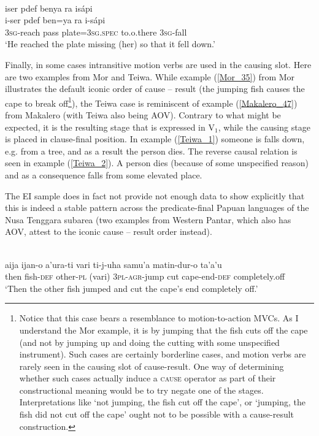 \ea \label{Biak_43}
\\
\glll iser pdef benya ra isápi \\
i-ser pdef ben=ya ra i-sápi \\
3\textsc{sg}-reach pass plate=3\textsc{sg}.\textsc{spec} to.o.there 3\textsc{sg}-fall \\
\glft `He reached the plate missing (her) so that it fell down.' \\
\z

Finally, in some cases intransitive motion verbs are used in the causing slot. Here are two examples from Mor and Teiwa. While example (\ref{Mor_35}) from Mor illustrates the default iconic order of cause -- result (the jumping fish causes the cape to break off\footnote{Notice that this case bears a resemblance to motion-to-action MVCs. As I understand the Mor example, it is by jumping that the fish cuts off the cape (and not by jumping up and doing the cutting with some unspecified instrument). Such cases are certainly borderline cases, and motion verbs are rarely seen in the causing slot of cause-result. One way of determining whether such cases actually induce a \textsc{cause} operator as part of their constructional meaning would be to try negate one of the stages. Interpretations like `not jumping, the fish cut off the cape', or `jumping, the fish did not cut off the cape' ought not to be possible with a cause-result construction.}), the Teiwa case is reminiscent of example (\ref{Makalero_47}) from Makalero (with Teiwa also being AOV). Contrary to what might be expected, it is the resulting stage that is expressed in V$_1$, while the causing stage is placed in clause-final position. In example (\ref{Teiwa_1}) someone is falls down, e.g. from a tree, and as a result the person dies. The reverse causal relation is seen in example (\ref{Teiwa_2}). A person dies (because of some unspecified reason) and as a consequence falls from some elevated place. 

The EI sample does in fact not provide not enough data to show explicitly that this is indeed a stable pattern across the predicate-final Papuan languages of the Nusa Tenggara subarea (two examples from Western Pantar, which also has AOV, attest to the iconic cause -- result order instead).

\ea \label{Mor_35}
\\
\gll aija ijan-o a'ura-ti vari ti-j-uha samu'a matin-dur-o ta'a'u \\
then fish-\textsc{def} other-\textsc{pl} (vari) 3\textsc{pl}-\textsc{agr}-jump cut cape-end-\textsc{def} completely.off \\
\glft `Then the other fish jumped and cut the cape's end completely off.'\\ 
\z

